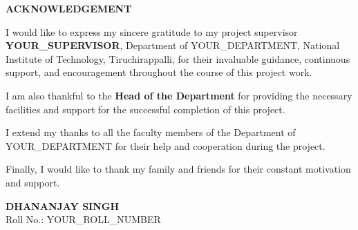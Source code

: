 \begin{center}
\textbf{\Large ACKNOWLEDGEMENT}
\end{center}

\vspace{1cm}

I would like to express my sincere gratitude to my project supervisor \textbf{YOUR\_SUPERVISOR}, Department of YOUR\_DEPARTMENT, National Institute of Technology, Tiruchirappalli, for their invaluable guidance, continuous support, and encouragement throughout the course of this project work.

I am also thankful to the \textbf{Head of the Department} for providing the necessary facilities and support for the successful completion of this project.

I extend my thanks to all the faculty members of the Department of YOUR\_DEPARTMENT for their help and cooperation during the project.

Finally, I would like to thank my family and friends for their constant motivation and support.

\vspace{2cm}

\begin{flushright}
\textbf{DHANANJAY SINGH} \\
Roll No.: YOUR\_ROLL\_NUMBER
\end{flushright}
